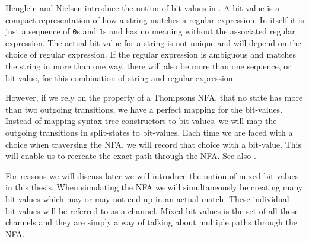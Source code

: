 Henglein and Nielsen introduce the notion of bit-values in
\cite{Henglein2010}. A bit-value is a compact representation of how a
string matches a regular expression. In itself it is just a sequence
of \texttt{0}s and \texttt{1}s and has no meaning without the
associated regular expression. The actual bit-value for a string is
not unique and will depend on the choice of regular expression. If the
regular expression is ambiguous and matches the string in more than
one way, there will also be more than one sequence, or bit-value, for
this combination of string and regular expression.

However, if we rely on the property of a Thompsons NFA, that no state
has more than two outgoing transitions, we have a perfect mapping for
the bit-values. Instead of mapping syntax tree constructors to
bit-values, we will map the outgoing transitions in split-states to
bit-values. Each time we are faced with a choice when traversing the
NFA, we will record that choice with a bit-value. This will enable us
to recreate the exact path through the NFA. See also \cite{Dube2000}.

For reasons we will discuss later we will introduce the notion of
mixed bit-values in this thesis. When simulating the NFA we will
simultaneously be creating many bit-values which may or may not end up
in an actual match. These individual bit-values will be referred to as
a channel. Mixed bit-values is the set of all these channels and they
are simply a way of talking about multiple paths through the NFA.

